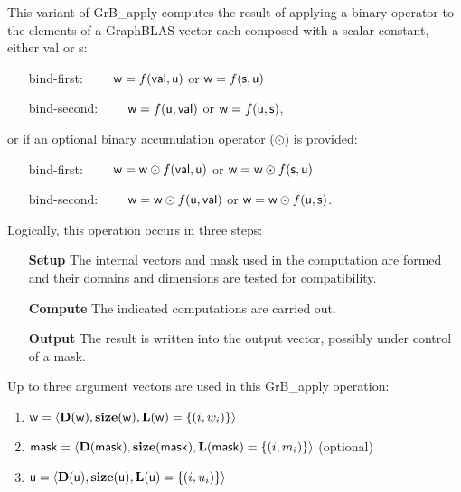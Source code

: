 {\color{red}
This variant of {\sf GrB\_apply} computes the result of applying a binary operator
to the elements of a GraphBLAS vector each composed with a scalar constant, either {\sf val} or {\sf s}:
\begin{itemize}[leftmargin=2.1in]
\item[bind-first:~~~~]  ${\sf w} = f({\sf val}, {\sf u})$ or ${\sf w} = f({\sf s}, {\sf u})$
\item[bind-second:~~~~] ${\sf w} = f({\sf u}, {\sf val})$ or ${\sf w} = f({\sf u}, {\sf s})$,
\end{itemize}
or if an optional binary accumulation operator ($\odot$) is provided:
\begin{itemize}[leftmargin=2.1in]
\item[bind-first:~~~~]  ${\sf w} = {\sf w} \odot f({\sf val}, {\sf u})$ or ${\sf w} = {\sf w} \odot f({\sf s}, {\sf u})$ 
\item[bind-second:~~~~] ${\sf w} = {\sf w} \odot f({\sf u}, {\sf val})$ or ${\sf w} = {\sf w} \odot f({\sf u}, {\sf s})$.  
\end{itemize}
}

Logically, this operation occurs in three steps:
\begin{enumerate}[leftmargin=0.75in]
\item[\bf Setup] The internal vectors and mask used in the computation are formed 
and their domains and dimensions are tested for compatibility.
\item[\bf Compute] The indicated computations are carried out.
\item[\bf Output] The result is written into the output vector, possibly under 
control of a mask.
\end{enumerate}

Up to three argument vectors are used in this {\sf GrB\_apply} operation:
\begin{enumerate}
	\item ${\sf w} = \langle \bold{D}({\sf w}),\bold{size}({\sf w}),
    \bold{L}({\sf w}) = \{(i,w_i) \} \rangle$

	\item ${\sf mask} = \langle \bold{D}({\sf mask}),\bold{size}({\sf mask}),
    \bold{L}({\sf mask}) = \{(i,m_i) \} \rangle$ (optional)

	\item ${\sf u} = \langle \bold{D}({\sf u}),\bold{size}({\sf u}),
    \bold{L}({\sf u}) = \{(i,u_i) \} \rangle$
\end{enumerate}

